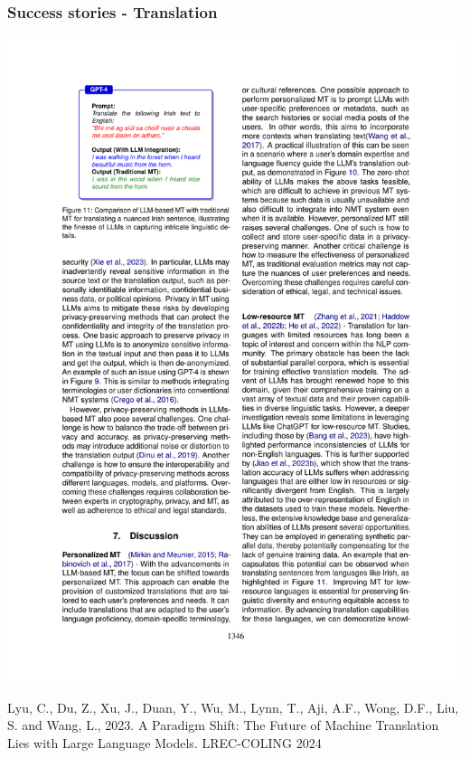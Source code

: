 \documentclass[]{article}
\newcommand\blfootnote[1]{%
  \begingroup
  \renewcommand\thefootnote{}\footnote{#1}%
  \addtocounter{footnote}{-1}%
  \endgroup
}
\begin{document}
\begin{frame}
	\frametitle{Success stories - Translation}


\centering \includegraphics[]{translation.pdf}
\par\footnotesize{Lyu, C., Du, Z., Xu, J., Duan, Y., Wu, M., Lynn, T., Aji, A.F., Wong, D.F., Liu, S. and Wang, L., 2023. A Paradigm Shift: The Future of Machine Translation Lies with Large Language Models. LREC-COLING 2024}
\end{frame}
\end{document}
